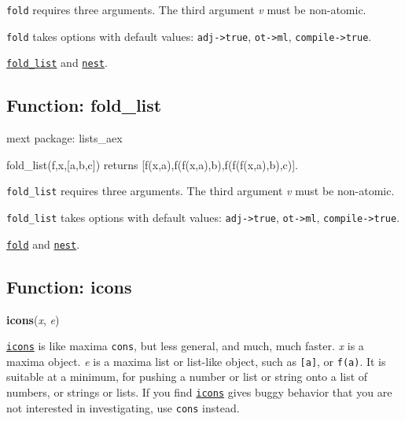 \documentclass[]{article}
\begin{document}
\vspace{5 pt}

   {\tt fold} requires three arguments.
    The third argument {\it v} must be non-atomic.


\vspace{5 pt}

{\tt fold} takes options with default values: {\tt adj->true}, {\tt ot->ml}, {\tt compile->true}.
\vspace{5 pt}


 \hyperlink{fold_list}{{\tt fold\_list}} and \hyperlink{nest}{{\tt nest}}.

\vspace{5 pt}


\subsection{Function: fold\_list\label{sec:fold_list}}
\hypertarget{fold_list}{}


\noindent mext package: lists\_aex



\vspace{5 pt}
fold\_list(f,x,[a,b,c]) returns [f(x,a),f(f(x,a),b),f(f(f(x,a),b),c)]. 

\vspace{5 pt}

   {\tt fold\_list} requires three arguments.
    The third argument {\it v} must be non-atomic.


\vspace{5 pt}

{\tt fold\_list} takes options with default values: {\tt adj->true}, {\tt ot->ml}, {\tt compile->true}.
\vspace{5 pt}


 \hyperlink{fold}{{\tt fold}} and \hyperlink{nest}{{\tt nest}}.

\vspace{5 pt}


\subsection{Function: icons\label{sec:icons}}
\hypertarget{icons}{}
{\bf icons}({\it x}, {\it e})



\vspace{5 pt}
\hyperlink{icons}{{\tt icons}} is like maxima {\tt cons}, but less general, and much, much faster. {\it x} is a maxima object. {\it e} is a maxima list or list-like object, such as \verb#[a]#, or \verb#f(a)#. It is suitable at a minimum, for pushing a number or list or string onto a list of 
numbers, or strings or lists. If you find \hyperlink{icons}{{\tt icons}} gives buggy behavior that you are not interested in investigating, use {\tt cons} instead. 
\end{document}
